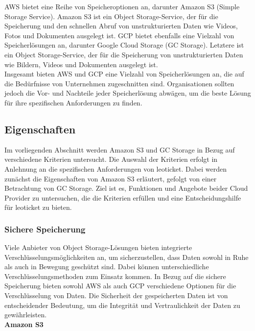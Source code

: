 AWS bietet eine Reihe von Speicheroptionen an, darunter Amazon S3 (Simple Storage Service). Amazon S3 ist ein Object Storage-Service, der für die Speicherung und den schnellen Abruf von unstrukturierten Daten wie Videos, Fotos und Dokumenten ausgelegt ist. GCP bietet ebenfalls eine Vielzahl von Speicherlösungen an, darunter Google Cloud Storage (GC Storage). Letztere ist ein Object Storage-Service, der für die Speicherung von unstrukturierten Daten wie Bildern, Videos und Dokumenten ausgelegt ist.\\
 
Insgesamt bieten AWS und GCP eine Vielzahl von Speicherlösungen an, die auf die Bedürfnisse von Unternehmen zugeschnitten sind. Organisationen sollten jedoch die Vor- und Nachteile jeder Speicherlösung abwägen, um die beste Lösung für ihre spezifischen Anforderungen zu finden.

\newpage

\subsection{Eigenschaften}

Im vorliegenden Abschnitt werden Amazon S3 und GC Storage in Bezug auf verschiedene Kriterien untersucht. Die Auswahl der Kriterien erfolgt in Anlehnung an die spezifischen Anforderungen von leoticket. Dabei werden zunächst die Eigenschaften von Amazon S3 erläutert, gefolgt von einer Betrachtung von GC Storage. Ziel ist es, Funktionen und Angebote beider Cloud Provider zu untersuchen, die die Kriterien erfüllen und eine Entscheidungshilfe für leoticket zu bieten. 

\newpage

\subsubsection{Sichere Speicherung}

Viele Anbieter von Object Storage-Lösungen bieten integrierte Verschlüsselungsmöglichkeiten an, um sicherzustellen, dass Daten sowohl in Ruhe als auch in Bewegung geschützt sind. Dabei können unterschiedliche Verschlüsselungsmethoden zum Einsatz kommen. In Bezug auf die sichere Speicherung bieten sowohl AWS als auch GCP verschiedene Optionen für die Verschlüsselung von Daten. Die Sicherheit der gespeicherten Daten ist von entscheidender Bedeutung, um die Integrität und Vertraulichkeit der Daten zu gewährleisten.\\

\textbf{Amazon S3}\\

